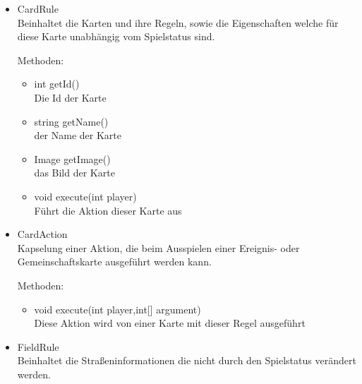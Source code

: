 \documentclass[a4paper,10pt]{article}
\begin{document}
\begin{itemize}
\item CardRule \\
Beinhaltet die Karten und ihre Regeln, sowie die Eigenschaften welche für diese Karte unabhängig vom Spielstatus sind.

Methoden:
\begin{itemize}
\item int getId()
\\Die Id der Karte
\item string getName()
\\der Name der Karte
\item Image getImage()
\\das Bild der Karte
\item void execute(int player)
\\Führt die Aktion dieser Karte aus
\end{itemize} %

\item CardAction \\
Kapselung einer Aktion, die beim Ausspielen einer Ereignis- oder Gemeinschaftskarte ausgeführt werden kann.

Methoden:
\begin{itemize}
\item void execute(int player,int[] argument)
\\Diese Aktion wird von einer Karte mit dieser Regel ausgeführt
\end{itemize} %

\item FieldRule\\
Beinhaltet die Straßeninformationen die nicht durch den Spielstatus verändert werden.


\end{itemize}
\end{document}
